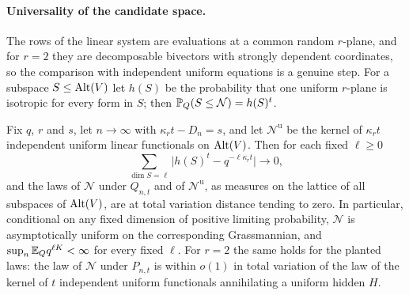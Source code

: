 \paragraph{Universality of the candidate space.}
The rows of the linear system are evaluations at a common random $r$-plane, and for $r=2$ they are
decomposable bivectors with strongly dependent coordinates, so the comparison with independent
uniform equations is a genuine step. For a subspace $S\le\operatorname{Alt}(V)$ let $h(S)$ be the probability
that one uniform $r$-plane is isotropic for every form in $S$; then $\mathbb{P}_Q(S\le\mathcal N)=h(S)^t$.

\begin{theorem}\label{spn:thm:hidden-universality}
Fix $q$, $r$ and $s$, let $n\to\infty$ with $\kappa_rt-D_n=s$, and let $\mathcal N^{\mathrm u}$ be
the kernel of $\kappa_rt$ independent uniform linear functionals on $\operatorname{Alt}(V)$. Then for each fixed
$\ell\ge0$
\begin{equation}\label{spn:eq:hidden-inc}
 \sum_{\dim S=\ell}\bigl|h(S)^t-q^{-\ell\kappa_rt}\bigr|\longrightarrow0,
\end{equation}
and the laws of $\mathcal N$ under $Q_{n,t}$ and of $\mathcal N^{\mathrm u}$, as measures on the
lattice of all subspaces of $\operatorname{Alt}(V)$, are at total variation distance tending to zero. In
particular, conditional on any fixed dimension of positive limiting probability, $\mathcal N$ is
asymptotically uniform on the corresponding Grassmannian, and $\sup_n\mathbb{E}_Qq^{\ell K}<\infty$ for
every fixed $\ell$. For $r=2$ the same holds for the planted laws: the law of $\mathcal N$ under
$P_{n,t}$ is within $o(1)$ in total variation of the law of the kernel of $t$ independent uniform
functionals annihilating a uniform hidden $H$.
\end{theorem}

